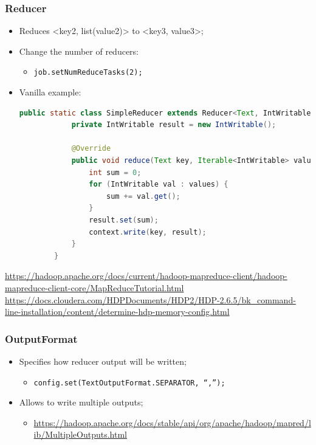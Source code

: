 \documentclass[aspectratio=169]{beamer}
\begin{document}
\begin{frame}[fragile]
	\frametitle{Reducer}

	\begin{itemize}
		\item Reduces <key2, list(value2)> to <key3, value3>;
		\item Change the number of reducers:
		      \begin{itemize}
			      \item \texttt{job.setNumReduceTasks(2);}
		      \end{itemize}
		\item Vanilla example:
		      \begin{lstlisting}[language=java,basicstyle=\tiny,columns=fullflexible]
        public static class SimpleReducer extends Reducer<Text, IntWritable, Text, IntWritable> {
            private IntWritable result = new IntWritable();

            @Override
            public void reduce(Text key, Iterable<IntWritable> values, Context context) {
                int sum = 0;
                for (IntWritable val : values) {
                    sum += val.get();
                }
                result.set(sum);
                context.write(key, result);
            }
        }
            \end{lstlisting}
	\end{itemize}

	\begin{center}
		{\tiny \href{https://hadoop.apache.org/docs/current/hadoop-mapreduce-client/hadoop-mapreduce-client-core/MapReduceTutorial.html}{https://hadoop.apache.org/docs/current/hadoop-mapreduce-client/hadoop-mapreduce-client-core/MapReduceTutorial.html}}
		{\tiny \href{https://docs.cloudera.com/HDPDocuments/HDP2/HDP-2.6.5/bk_command-line-installation/content/determine-hdp-memory-config.html}{https://docs.cloudera.com/HDPDocuments/HDP2/HDP-2.6.5/bk\_command-line-installation/content/determine-hdp-memory-config.html}}
	\end{center}
\end{frame}

\begin{frame}
	\frametitle{OutputFormat}

	\begin{itemize}
		\item Specifies how reducer output will be written;
		      \begin{itemize}
			      \item {\scriptsize \texttt{config.set(TextOutputFormat.SEPARATOR, ``,'');}}
		      \end{itemize}
		\item Allows to write multiple outputs;
		      \begin{itemize}
			      \item {\tiny \href{https://hadoop.apache.org/docs/stable/api/org/apache/hadoop/mapred/lib/MultipleOutputs.html}{https://hadoop.apache.org/docs/stable/api/org/apache/hadoop/mapred/lib/MultipleOutputs.html}}
		      \end{itemize}
	\end{itemize}
\end{frame}
\end{document}
